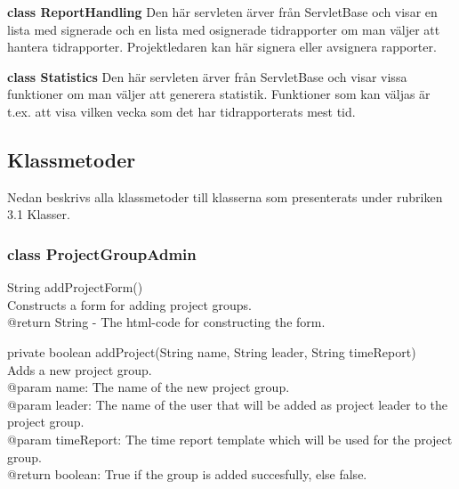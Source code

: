 \documentclass[a4paper]{article}
\begin{document}
\vspace{5mm}
\begin{hangparas}{1.5em}{1}
\textbf{class ReportHandling} Den här servleten ärver från ServletBase och visar en lista med signerade och en lista med osignerade tidrapporter om man väljer att hantera tidrapporter. Projektledaren kan här signera eller avsignera rapporter.\end{hangparas}

\vspace{5mm}
\begin{hangparas}{1.5em}{1}
\textbf{class Statistics} Den här servleten ärver från ServletBase och visar vissa funktioner om man väljer att generera statistik. Funktioner som kan väljas är t.ex. att visa vilken vecka som det har tidrapporterats mest tid.\\ \end{hangparas}

\subsection{Klassmetoder}
Nedan beskrivs alla klassmetoder till klasserna som presenterats under rubriken 3.1 Klasser.

\subsubsection{class ProjectGroupAdmin}

\begin{hangparas}{1.5em}{1}
String addProjectForm()\\
Constructs a form for adding project groups.\\
@return String - The html-code for constructing the form.
\end{hangparas}

\vspace{5mm}
\begin{hangparas}{1.5em}{1}
private boolean addProject(String name, String leader, String timeReport)\\
Adds a new project group.\\
@param name: The name of the new project group.\\
@param leader: The name of the user that will be added as project 
leader to the project group.\\
@param timeReport: The time report template which will be used for 
the project group.\\
@return boolean: True if the group is added succesfully, else false.
\end{hangparas}
\end{document}
